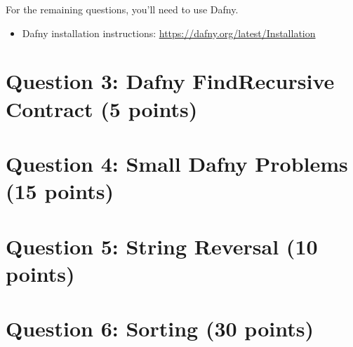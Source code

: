 \documentclass[10pt,hidelinks]{article}
\begin{document}
\newpage
For the remaining questions, you'll need to use Dafny.
\begin{itemize}
\item Dafny installation instructions: \url{https://dafny.org/latest/Installation}
\end{itemize}

\section*{Question 3: Dafny FindRecursive Contract (5 points)}


\section*{Question 4: Small Dafny Problems (15 points)}


\section*{Question 5: String Reversal (10 points)}


\section*{Question 6: Sorting (30 points)} %

\end{document}
